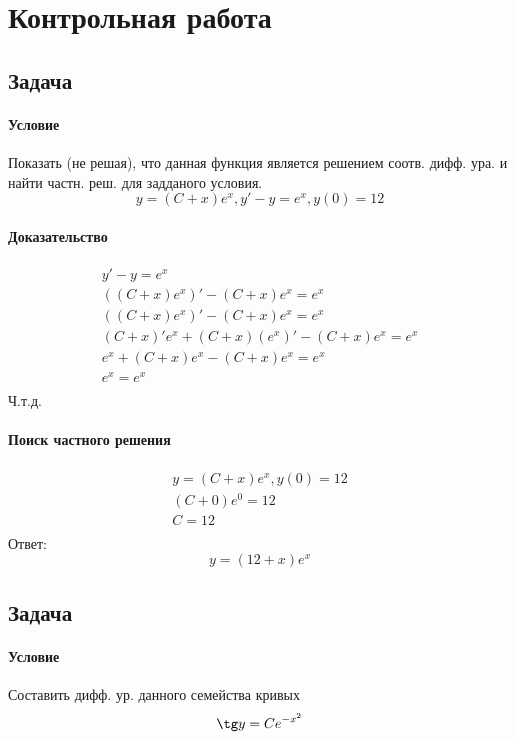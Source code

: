 \section{Контрольная работа }

\subsection{Задача }
\paragraph{Условие}
Показать (не решая), что данная функция является решением соотв. дифф. ура. и найти частн. реш. для задданого условия.
\[ y = (C + x)e^x, y' - y = e^x, y(0) = 12 \]

\paragraph{Доказательство}
\begin{gather*}
	y' - y = e^x \\
	((C + x)e^x)' - (C + x)e^x = e^x \\
	((C + x)e^x)' - (C + x)e^x = e^x \\
	(C + x)'e^x + (C + x)(e^x)' - (C + x)e^x = e^x \\
	e^x + (C + x)e^x - (C + x)e^x = e^x \\
	e^x = e^x \\
\end{gather*}
Ч.т.д.

\paragraph{Поиск частного решения}
\begin{gather*}
	y = (C + x)e^x, y(0) = 12 \\
	(C + 0)e^0 = 12 \\
	C = 12 \\
\end{gather*}
Ответ:
\[y = (12 + x)e^x\]

\subsection{Задача }
\paragraph{Условие}
Составить дифф. ур. данного семейства кривых
\[ \tg y = Ce^{-x^2} \]

